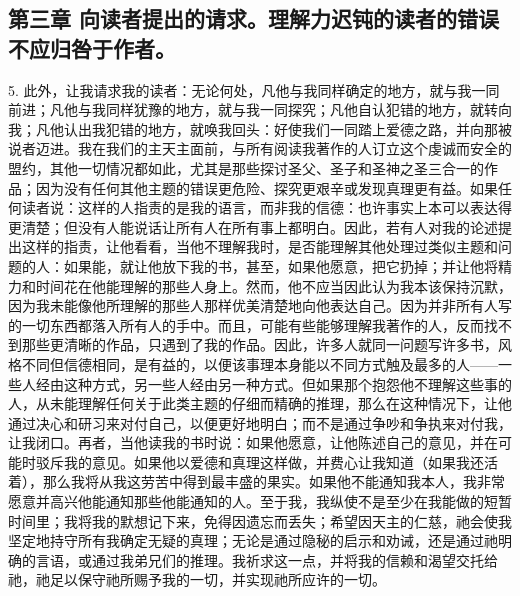 
\subsection{第三章 向读者提出的请求。理解力迟钝的读者的错误不应归咎于作者。}

5. 此外，让我请求我的读者：无论何处，凡他与我同样确定的地方，就与我一同前进；凡他与我同样犹豫的地方，就与我一同探究；凡他自认犯错的地方，就转向我；凡他认出我犯错的地方，就唤我回头：好使我们一同踏上爱德之路，并向那被说者迈进。我在我们的主天主面前，与所有阅读我著作的人订立这个虔诚而安全的盟约，其他一切情况都如此，尤其是那些探讨圣父、圣子和圣神之圣三合一的作品；因为没有任何其他主题的错误更危险、探究更艰辛或发现真理更有益。如果任何读者说：这样的人指责的是我的语言，而非我的信德：也许事实上本可以表达得更清楚；但没有人能说话让所有人在所有事上都明白。因此，若有人对我的论述提出这样的指责，让他看看，当他不理解我时，是否能理解其他处理过类似主题和问题的人：如果能，就让他放下我的书，甚至，如果他愿意，把它扔掉；并让他将精力和时间花在他能理解的那些人身上。然而，他不应当因此认为我本该保持沉默，因为我未能像他所理解的那些人那样优美清楚地向他表达自己。因为并非所有人写的一切东西都落入所有人的手中。而且，可能有些能够理解我著作的人，反而找不到那些更清晰的作品，只遇到了我的作品。因此，许多人就同一问题写许多书，风格不同但信德相同，是有益的，以便该事理本身能以不同方式触及最多的人——一些人经由这种方式，另一些人经由另一种方式。但如果那个抱怨他不理解这些事的人，从未能理解任何关于此类主题的仔细而精确的推理，那么在这种情况下，让他通过决心和研习来对付自己，以便更好地明白；而不是通过争吵和争执来对付我，让我闭口。再者，当他读我的书时说：如果他愿意，让他陈述自己的意见，并在可能时驳斥我的意见。如果他以爱德和真理这样做，并费心让我知道（如果我还活着），那么我将从我这劳苦中得到最丰盛的果实。如果他不能通知我本人，我非常愿意并高兴他能通知那些他能通知的人。至于我，我纵使不是至少在我能做的短暂时间里；我将我的默想记下来，免得因遗忘而丢失；希望因天主的仁慈，祂会使我坚定地持守所有我确定无疑的真理；无论是通过隐秘的启示和劝诫，还是通过祂明确的言语，或通过我弟兄们的推理。我祈求这一点，并将我的信赖和渴望交托给祂，祂足以保守祂所赐予我的一切，并实现祂所应许的一切。\par

